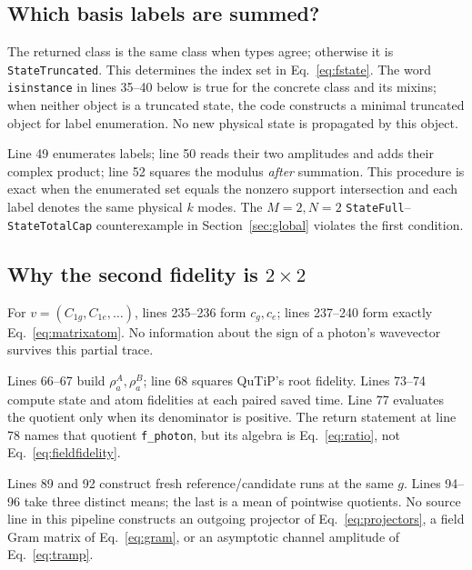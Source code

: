 \documentclass[11pt,a4paper]{article}
\newcommand{\code}[1]{\nolinkurl{#1}}
\begin{document}
\subsection{Which basis labels are summed?}

The returned class is the same class when types agree; otherwise it is \code{StateTruncated}. This determines the index set in Eq.~\eqref{eq:fstate}. The word \code{isinstance} in lines 35--40 below is true for the concrete class and its mixins; when neither object is a truncated state, the code constructs a minimal truncated object for label enumeration. No new physical state is propagated by this object.

Line 49 enumerates labels; line 50 reads their two amplitudes and adds their complex product; line 52 squares the modulus \emph{after} summation. This procedure is exact when the enumerated set equals the nonzero support intersection and each label denotes the same physical $k$ modes. The $M=2,N=2$ \code{StateFull}--\code{StateTotalCap} counterexample in Section~\ref{sec:global} violates the first condition.

\subsection[Why the second fidelity is 2 by 2]{Why the second fidelity is $2\times2$}

For $v=(C_{1g},C_{1e},\ldots)$, lines 235--236 form $c_g,c_e$; lines 237--240 form exactly Eq.~\eqref{eq:matrixatom}. No information about the sign of a photon's wavevector survives this partial trace.

Lines 66--67 build $\rho_a^A,\rho_a^B$; line 68 squares QuTiP's root fidelity. Lines 73--74 compute state and atom fidelities at each paired saved time. Line 77 evaluates the quotient only when its denominator is positive. The return statement at line 78 names that quotient \code{f_photon}, but its algebra is Eq.~\eqref{eq:ratio}, not Eq.~\eqref{eq:fieldfidelity}.

Lines 89 and 92 construct fresh reference/candidate runs at the same $g$. Lines 94--96 take three distinct means; the last is a mean of pointwise quotients. No source line in this pipeline constructs an outgoing projector of Eq.~\eqref{eq:projectors}, a field Gram matrix of Eq.~\eqref{eq:gram}, or an asymptotic channel amplitude of Eq.~\eqref{eq:tramp}.
\end{document}

